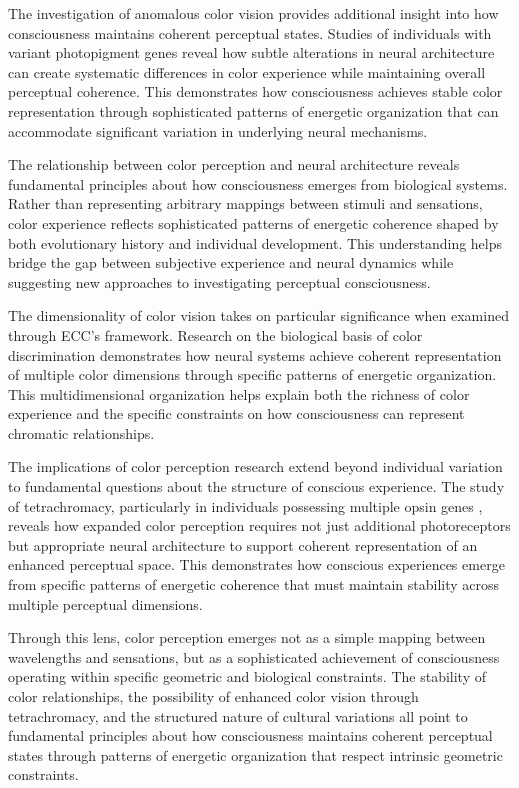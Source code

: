 \begin{refsection}
The investigation of anomalous color vision provides additional insight into how consciousness maintains coherent perceptual states. Studies of individuals with variant photopigment genes \cite{Jordan2010} reveal how subtle alterations in neural architecture can create systematic differences in color experience while maintaining overall perceptual coherence. This demonstrates how consciousness achieves stable color representation through sophisticated patterns of energetic organization that can accommodate significant variation in underlying neural mechanisms.

The relationship between color perception and neural architecture reveals fundamental principles about how consciousness emerges from biological systems. Rather than representing arbitrary mappings between stimuli and sensations, color experience reflects sophisticated patterns of energetic coherence shaped by both evolutionary history and individual development. This understanding helps bridge the gap between subjective experience and neural dynamics while suggesting new approaches to investigating perceptual consciousness.

The dimensionality of color vision takes on particular significance when examined through ECC's framework. Research on the biological basis of color discrimination \cite{Jacobs2018} demonstrates how neural systems achieve coherent representation of multiple color dimensions through specific patterns of energetic organization. This multidimensional organization helps explain both the richness of color experience and the specific constraints on how consciousness can represent chromatic relationships.

The implications of color perception research extend beyond individual variation to fundamental questions about the structure of conscious experience. The study of tetrachromacy, particularly in individuals possessing multiple opsin genes \cite{Jameson2001}, reveals how expanded color perception requires not just additional photoreceptors but appropriate neural architecture to support coherent representation of an enhanced perceptual space. This demonstrates how conscious experiences emerge from specific patterns of energetic coherence that must maintain stability across multiple perceptual dimensions.

Through this lens, color perception emerges not as a simple mapping between wavelengths and sensations, but as a sophisticated achievement of consciousness operating within specific geometric and biological constraints. The stability of color relationships, the possibility of enhanced color vision through tetrachromacy, and the structured nature of cultural variations all point to fundamental principles about how consciousness maintains coherent perceptual states through patterns of energetic organization that respect intrinsic geometric constraints.


\end{refsection}
